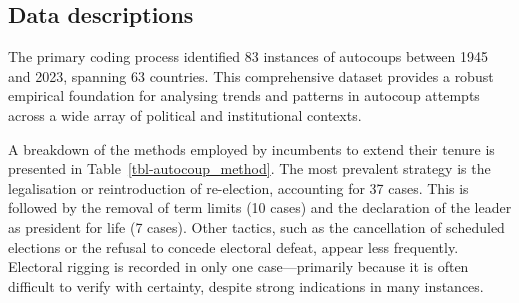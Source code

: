 \documentclass[
  12pt,
]{report}
\begin{document}
\subsection*{Data descriptions}\label{data-descriptions}

The primary coding process identified 83 instances of autocoups between
1945 and 2023, spanning 63 countries. This comprehensive dataset
provides a robust empirical foundation for analysing trends and patterns
in autocoup attempts across a wide array of political and institutional
contexts.

A breakdown of the methods employed by incumbents to extend their tenure
is presented in Table~\ref{tbl-autocoup_method}. The most prevalent
strategy is the legalisation or reintroduction of re-election,
accounting for 37 cases. This is followed by the removal of term limits
(10 cases) and the declaration of the leader as president for life (7
cases). Other tactics, such as the cancellation of scheduled elections
or the refusal to concede electoral defeat, appear less frequently.
Electoral rigging is recorded in only one case---primarily because it is
often difficult to verify with certainty, despite strong indications in
many instances.

\begin{table}

\caption{\label{tbl-autocoup_method}Autocoup Methods and Success Rates
(1945-2023)}


\end{table}%
\end{document}
